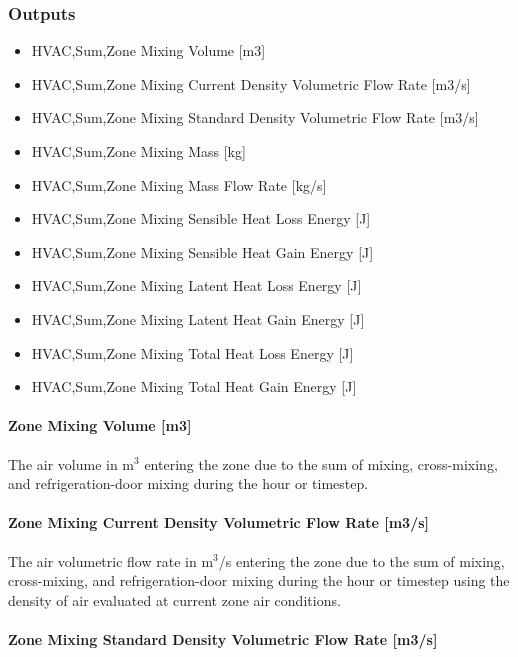 \subsubsection{Outputs}\label{outputs-5-000}

\begin{itemize}
\item
  HVAC,Sum,Zone Mixing Volume {[}m3{]}
\item
  HVAC,Sum,Zone Mixing Current Density Volumetric Flow Rate {[}m3/s{]}
\item
  HVAC,Sum,Zone Mixing Standard Density Volumetric Flow Rate {[}m3/s{]}
\item
  HVAC,Sum,Zone Mixing Mass {[}kg{]}
\item
  HVAC,Sum,Zone Mixing Mass Flow Rate {[}kg/s{]}
\item
  HVAC,Sum,Zone Mixing Sensible Heat Loss Energy {[}J{]}
\item
  HVAC,Sum,Zone Mixing Sensible Heat Gain Energy {[}J{]}
\item
  HVAC,Sum,Zone Mixing Latent Heat Loss Energy {[}J{]}
\item
  HVAC,Sum,Zone Mixing Latent Heat Gain Energy {[}J{]}
\item
  HVAC,Sum,Zone Mixing Total Heat Loss Energy {[}J{]}
\item
  HVAC,Sum,Zone Mixing Total Heat Gain Energy {[}J{]}
\end{itemize}

\paragraph{Zone Mixing Volume {[}m3{]}}\label{zone-mixing-volume-m3-2}

The air volume in m\(^{3}\) entering the zone due to the sum of mixing, cross-mixing, and refrigeration-door mixing during the hour or timestep.

\paragraph{Zone Mixing Current Density Volumetric Flow Rate {[}m3/s{]}}\label{zone-mixing-current-density-volumetric-flow-rate-m3s-2}

The air volumetric flow rate in m\(^{3}\)/s entering the zone due to the sum of mixing, cross-mixing, and refrigeration-door mixing during the hour or timestep using the density of air evaluated at current zone air conditions.

\paragraph{Zone Mixing Standard Density Volumetric Flow Rate {[}m3/s{]}}\label{zone-mixing-standard-density-volumetric-flow-rate-m3s-2}

